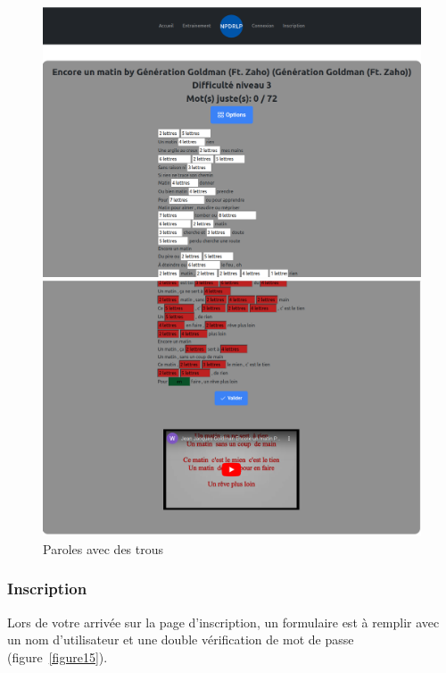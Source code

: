 \documentclass[12pt,french]{article}
\begin{document}
\begin{figure}[H]
	\centering
	\begin{minipage}{.5\textwidth}
		\centering
		\includegraphics[scale=0.15]{diffi1.png}
	\end{minipage}%
	\begin{minipage}{.5\textwidth}
		\centering
		\includegraphics[scale=0.15]{diffi2.png}
	\end{minipage}
	\caption{Paroles avec des trous}
	\label{figure14} 
\end{figure}

\subsubsection{Inscription}

Lors de votre arrivée sur la page d'inscription, un formulaire est à remplir avec un nom d'utilisateur et une double vérification de mot de passe (figure~\ref{figure15}).
\end{document}
